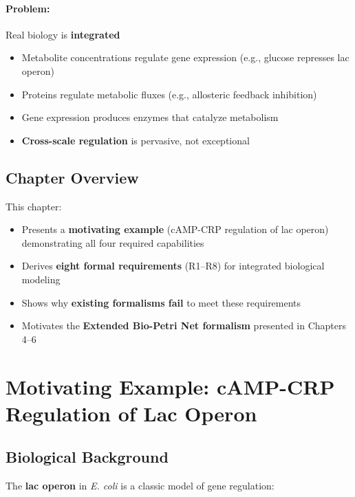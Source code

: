 \paragraph{Problem:} Real biology is \textbf{integrated}
\begin{itemize}
    \item Metabolite concentrations regulate gene expression (e.g., glucose represses lac operon)
    \item Proteins regulate metabolic fluxes (e.g., allosteric feedback inhibition)
    \item Gene expression produces enzymes that catalyze metabolism
    \item \textbf{Cross-scale regulation} is pervasive, not exceptional
\end{itemize}

\subsection{Chapter Overview}
\label{subsec:chapter3-overview}

This chapter:
\begin{itemize}
    \item Presents a \textbf{motivating example} (cAMP-CRP regulation of lac operon) demonstrating all four required capabilities
    \item Derives \textbf{eight formal requirements} (R1--R8) for integrated biological modeling
    \item Shows why \textbf{existing formalisms fail} to meet these requirements
    \item Motivates the \textbf{Extended Bio-Petri Net formalism} presented in Chapters 4--6
\end{itemize}

\section{Motivating Example: cAMP-CRP Regulation of Lac Operon}
\label{sec:lac-operon-example}

\subsection{Biological Background}
\label{subsec:lac-operon-background}

The \textbf{lac operon} in \textit{E. coli} is a classic model of gene regulation:

